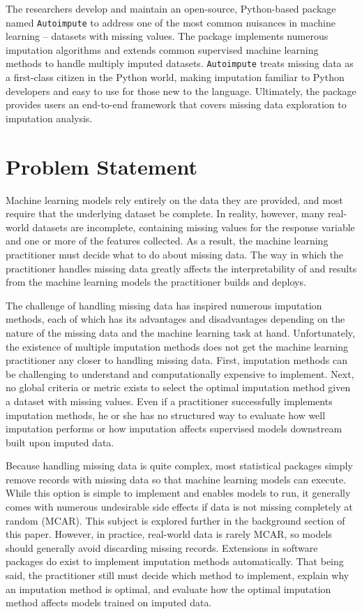 \documentclass[12pt,oneside]{chicagocapstone}
\begin{document}
The researchers develop and maintain an open-source, Python-based
package named \texttt{Autoimpute} to address one of the most common
nuisances in machine learning -- datasets with missing values. The
package implements numerous imputation algorithms and extends common
supervised machine learning methods to handle multiply imputed datasets.
\texttt{Autoimpute} treats missing data as a first-class citizen in the
Python world, making imputation familiar to Python developers and easy
to use for those new to the language. Ultimately, the package provides
users an end-to-end framework that covers missing data exploration to
imputation analysis.

\section*{Problem Statement}\label{problem-statement}

Machine learning models rely entirely on the data they are provided, and
most require that the underlying dataset be complete. In reality,
however, many real-world datasets are incomplete, containing missing
values for the response variable and one or more of the features
collected. As a result, the machine learning practitioner must decide
what to do about missing data. The way in which the practitioner handles
missing data greatly affects the interpretability of and results from
the machine learning models the practitioner builds and deploys.

The challenge of handling missing data has inspired numerous imputation
methods, each of which has its advantages and disadvantages depending on
the nature of the missing data and the machine learning task at hand.
Unfortunately, the existence of multiple imputation methods does not get
the machine learning practitioner any closer to handling missing data.
First, imputation methods can be challenging to understand and
computationally expensive to implement. Next, no global criteria or
metric exists to select the optimal imputation method given a dataset
with missing values. Even if a practitioner successfully implements
imputation methods, he or she has no structured way to evaluate how well
imputation performs or how imputation affects supervised models
downstream built upon imputed data.

Because handling missing data is quite complex, most statistical
packages simply remove records with missing data so that machine
learning models can execute. While this option is simple to implement
and enables models to run, it generally comes with numerous undesirable
side effects if data is not missing completely at random (MCAR). This
subject is explored further in the background section of this paper.
However, in practice, real-world data is rarely MCAR, so models should
generally avoid discarding missing records. Extensions in software
packages do exist to implement imputation methods automatically. That
being said, the practitioner still must decide which method to
implement, explain why an imputation method is optimal, and evaluate how
the optimal imputation method affects models trained on imputed data.
\end{document}
